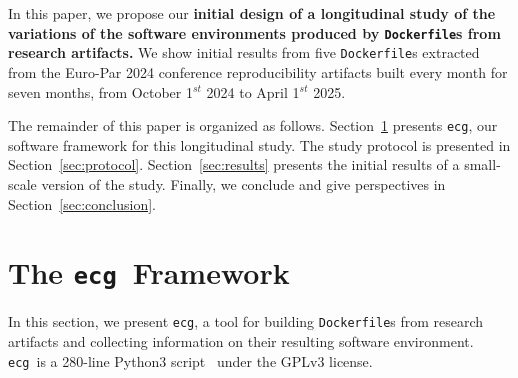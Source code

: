 \documentclass[sigconf,natbib=false]{acmart}
\newcommand{\df}{\texttt{Dockerfile}}
\newcommand{\ecg}{\texttt{ecg}}
\newcommand{\todo}[1]{{\color{red}{TODO: #1}}}
\newcommand{\fmc}[1]{{}} %
\begin{document}
In this paper, we propose our \textbf{initial design of a longitudinal study of the variations of the software environments produced by \df s from research artifacts.}
We show initial results from five \df s extracted from the Euro-Par 2024 conference reproducibility artifacts built every month for seven months, from October 1$^{st}$ 2024 to April 1$^{st}$ 2025.

% 

The remainder of this paper is organized as follows.
Section~\ref{sec:ecg} presents \ecg, our software framework for this longitudinal study.
The study protocol is presented in Section~\ref{sec:protocol}.
Section~\ref{sec:results} presents the initial results of a small-scale version of the study.
Finally, we conclude and give perspectives in Section~\ref{sec:conclusion}.

\section{The \ecg\ Framework}\label{sec:ecg}


In this section, we present \ecg, \fmc{Can we explain the acronym?} a tool for building \df s from research artifacts and collecting information on their resulting software environment.
\ecg\ is a 280-line Python3 script~\cite{ecg} under the GPLv3 license.
\end{document}
